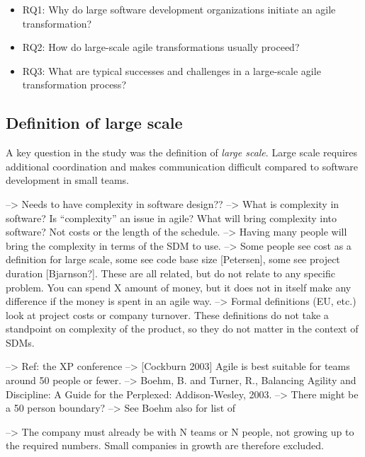 \documentclass[preprint,authoryear,12pt]{elsarticle}
\begin{document}
\begin{itemize}

\item
RQ1: Why do large software development organizations initiate an agile
transformation?

\item
RQ2: How do large-scale agile transformations usually proceed?

\item
RQ3: What are typical successes and challenges in a large-scale agile
     transformation process?

\end{itemize}


\subsection{Definition of large scale}
\label{sec:largescale}

A key question in the study was the definition of \emph{large scale}. Large
scale requires additional coordination and makes communication difficult
compared to software development in small teams.

--> Needs to have complexity in software design?? --> What is complexity in software?
    Is ``complexity'' an issue in agile?
    What will bring complexity into software? Not costs or the length of the
    schedule. --> Having many people will bring the complexity in terms of the
    SDM to use.
--> Some people see cost as a definition for large scale, some see code base
    size [Petersen], some see project duration [Bjarnson?]. These are all
    related, but do not relate to any specific problem. You can spend X amount
    of money, but it does not in itself make any difference if the money is
    spent in an agile way.
--> Formal definitions (EU, etc.) look at project costs or company turnover.
    These definitions do not take a standpoint on complexity of the product, so
    they do not matter in the context of SDMs.

--> Ref: the XP conference
--> [Cockburn 2003] Agile is best suitable for teams around 50 people or fewer.
--> Boehm, B. and Turner, R., Balancing Agility and Discipline: A Guide for the
    Perplexed: Addison-Wesley, 2003. --> There might be a 50 person boundary?
    --> See Boehm also for list of 

--> The company must already be with N teams or N people, not growing up to the
    required numbers. Small companies in growth are therefore excluded. 
\end{document}
